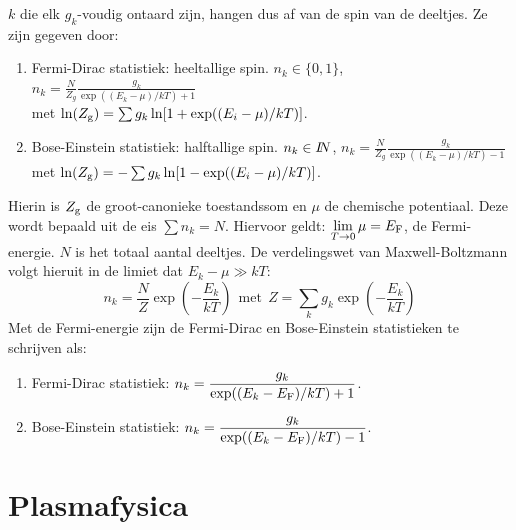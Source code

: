\documentclass[twoside]{report}
\begin{document}
$k$ die elk $g_k$-voudig ontaard zijn, hangen dus af van de spin van de
deeltjes. Ze zijn gegeven door:
\begin{enumerate}
\item Fermi-Dirac statistiek: heeltallige spin. $n_k\in\{0,1\}$,
      $\displaystyle n_k=\frac{N}{Z_g}\frac{g_k}{\exp((E_k-\mu)/kT)+1}$\\
      met $\ln(Z_{\rm g})=\sum g_k\ln[1+\exp((E_i-\mu)/kT)]$.
\item Bose-Einstein statistiek: halftallige spin. $n_k\in I\hspace{-1mm}N$,
      $\displaystyle n_k=\frac{N}{Z_g}\frac{g_k}{\exp((E_k-\mu)/kT)-1}$\\
      met $\ln(Z_{\rm g})=-\sum g_k\ln[1-\exp((E_i-\mu)/kT)]$.
\end{enumerate}
Hierin is $Z_{\rm g}$ de groot-canonieke toestandssom en $\mu$ de chemische
potentiaal. Deze wordt bepaald uit de eis $\sum n_k=N$. Hiervoor geldt:
$\displaystyle\lim\limits_{T\rightarrow0}\mu=E_{\rm F}$, de Fermi-energie.
$N$ is het totaal aantal deeltjes. De verdelingswet van Maxwell-Boltzmann
volgt hieruit in de limiet dat $E_k-\mu\gg kT$:
\[
n_k=\frac{N}{Z}\exp\left(-\frac{E_k}{kT}\right)~~\mbox{met}~~
Z=\sum_kg_k\exp\left(-\frac{E_k}{kT}\right)
\]
Met de Fermi-energie zijn de Fermi-Dirac en Bose-Einstein statistieken te
schrijven als:
\begin{enumerate}
\item Fermi-Dirac statistiek: $\displaystyle n_k=\frac{g_k}{\exp((E_k-E_{\rm F})/kT)+1}$.
\item Bose-Einstein statistiek: $\displaystyle n_k=\frac{g_k}{\exp((E_k-E_{\rm F})/kT)-1}$.
\end{enumerate}

\chapter{Plasmafysica}
\end{document}
